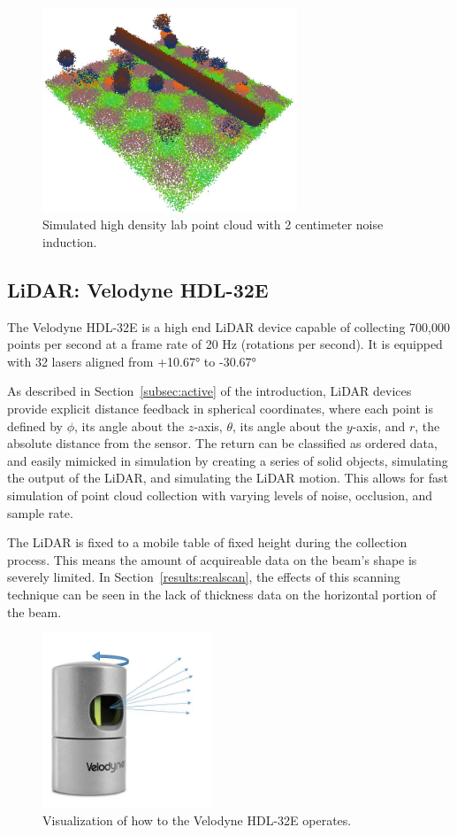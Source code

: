 \documentclass[12pt]{drexelthesis}
\let\Oldsubsection\subsection
\renewcommand{\subsection}{\FloatBarrier\Oldsubsection}
\begin{document}
\begin{figure}[!ht]
	\centering
	\includegraphics[width=3in]{simulated-lab-scan/2cmnoise/rawcloud.JPG}
	\caption[Simulated high density lab point cloud with 2cm noise induction]{\centering Simulated high density lab point cloud with 2 centimeter noise induction.}
	\label{technical:2cmdense}
\end{figure}

\subsection{LiDAR: Velodyne HDL-32E}
The Velodyne HDL-32E is a high end LiDAR device capable of collecting 700,000 points per second at a frame rate of 20 Hz (rotations per second). It is equipped with 32 lasers aligned from +\ang{10.67} to -\ang{30.67}

As described in Section~\ref{subsec:active} of the introduction, LiDAR devices provide explicit distance feedback in spherical coordinates, where each point is defined by $\phi$, its angle about the $z$-axis, $\theta$, its angle about the $y$-axis, and $r$, the absolute distance from the sensor. The return can be classified as ordered data, and easily mimicked in simulation by creating a series of solid objects, simulating the output of the LiDAR, and simulating the LiDAR motion. This allows for fast simulation of point cloud collection with varying levels of noise, occlusion, and sample rate.

The LiDAR is fixed to a mobile table of fixed height during the collection process. This means the amount of acquireable data on the beam's shape is severely limited. In Section~\ref{results:realscan}, the effects of this scanning technique can be seen in the lack of thickness data on the horizontal portion of the beam.

\begin{figure}[!ht]
	\centering
		\includegraphics[width=2in]{cloudCollection/velodyneLiDAR.jpg}
		\caption[Velodyne LiDAR Operation]{\centering Visualization of how to the Velodyne HDL-32E operates.}
\end{figure}
\end{document}
